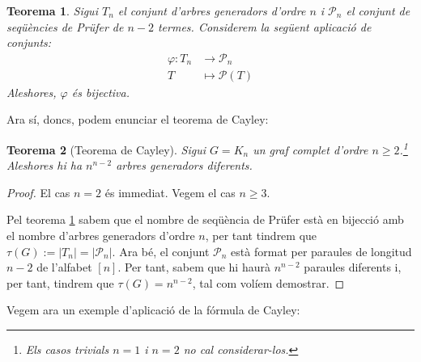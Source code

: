 \documentclass{article}
\newtheorem{theorem}{Teorema}[section]
\begin{document}
\begin{theorem}\label{bij}
    Sigui $T_n$ el conjunt d'arbres generadors d'ordre $n$ i $\mathcal{P}_n$ el conjunt de seqüències de Prüfer de $n-2$ termes. Considerem la següent aplicació de conjunts:
    \begin{align*}
        \varphi:T_n & \rightarrow \mathcal{P}_n \\
        T           & \mapsto \mathcal{P}(T)
    \end{align*}
    Aleshores, $\varphi$ és bijectiva.
\end{theorem}
Ara sí, doncs, podem enunciar el teorema de Cayley:
\begin{theorem}[Teorema de Cayley]
    Sigui $G=K_n$ un graf complet d'ordre $n\geq 2$.\footnote{Els casos trivials $n=1$ i $n=2$ no cal considerar-los.} Aleshores hi ha $n^{n-2}$ arbres generadors diferents.
\end{theorem}
\begin{proof}
    El cas $n=2$ és immediat. Vegem el cas $n\geq3$.\par
    Pel teorema \ref{bij} sabem que el nombre de seqüència de Prüfer està en bijecció amb el nombre d'arbres generadors d'ordre $n$, per tant tindrem que $\tau(G):=|T_n|=|\mathcal{P}_n|$. Ara bé, el conjunt $\mathcal{P}_n$ està format per paraules de longitud $n-2$ de l'alfabet $[n]$. Per tant, sabem que hi haurà $n^{n-2}$ paraules diferents i, per tant, tindrem que $\tau(G)=n^{n-2}$, tal com volíem demostrar.
\end{proof}
Vegem ara un exemple d'aplicació de la fórmula de Cayley:
\end{document}
